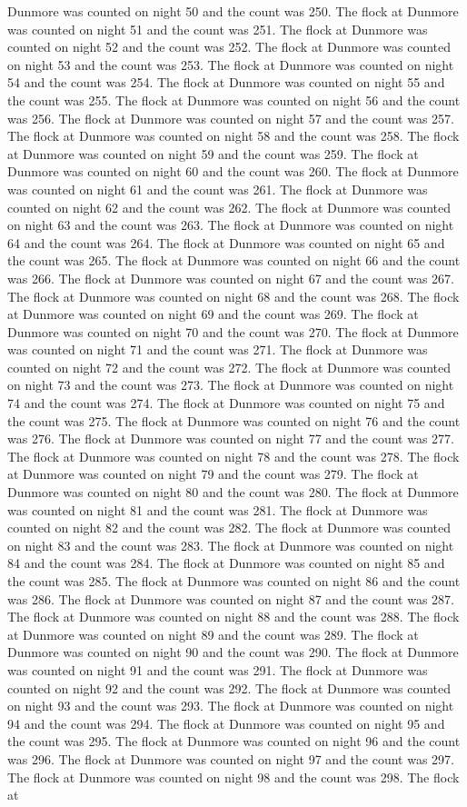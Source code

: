 Dunmore was counted on night 50 and the count was 250. The flock at Dunmore was counted on night 51 and the count was 251. The flock at Dunmore was counted on night 52 and the count was 252. The flock at Dunmore was counted on night 53 and the count was 253. The flock at Dunmore was counted on night 54 and the count was 254. The flock at Dunmore was counted on night 55 and the count was 255. The flock at Dunmore was counted on night 56 and the count was 256. The flock at Dunmore was counted on night 57 and the count was 257. The flock at Dunmore was counted on night 58 and the count was 258. The flock at Dunmore was counted on night 59 and the count was 259. The flock at Dunmore was counted on night 60 and the count was 260. The flock at Dunmore was counted on night 61 and the count was 261. The flock at Dunmore was counted on night 62 and the count was 262. The flock at Dunmore was counted on night 63 and the count was 263. The flock at Dunmore was counted on night 64 and the count was 264. The flock at Dunmore was counted on night 65 and the count was 265. The flock at Dunmore was counted on night 66 and the count was 266. The flock at Dunmore was counted on night 67 and the count was 267. The flock at Dunmore was counted on night 68 and the count was 268. The flock at Dunmore was counted on night 69 and the count was 269. The flock at Dunmore was counted on night 70 and the count was 270. The flock at Dunmore was counted on night 71 and the count was 271. The flock at Dunmore was counted on night 72 and the count was 272. The flock at Dunmore was counted on night 73 and the count was 273. The flock at Dunmore was counted on night 74 and the count was 274. The flock at Dunmore was counted on night 75 and the count was 275. The flock at Dunmore was counted on night 76 and the count was 276. The flock at Dunmore was counted on night 77 and the count was 277. The flock at Dunmore was counted on night 78 and the count was 278. The flock at Dunmore was counted on night 79 and the count was 279. The flock at Dunmore was counted on night 80 and the count was 280. The flock at Dunmore was counted on night 81 and the count was 281. The flock at Dunmore was counted on night 82 and the count was 282. The flock at Dunmore was counted on night 83 and the count was 283. The flock at Dunmore was counted on night 84 and the count was 284. The flock at Dunmore was counted on night 85 and the count was 285. The flock at Dunmore was counted on night 86 and the count was 286. The flock at Dunmore was counted on night 87 and the count was 287. The flock at Dunmore was counted on night 88 and the count was 288. The flock at Dunmore was counted on night 89 and the count was 289. The flock at Dunmore was counted on night 90 and the count was 290. The flock at Dunmore was counted on night 91 and the count was 291. The flock at Dunmore was counted on night 92 and the count was 292. The flock at Dunmore was counted on night 93 and the count was 293. The flock at Dunmore was counted on night 94 and the count was 294. The flock at Dunmore was counted on night 95 and the count was 295. The flock at Dunmore was counted on night 96 and the count was 296. The flock at Dunmore was counted on night 97 and the count was 297. The flock at Dunmore was counted on night 98 and the count was 298. The flock at 